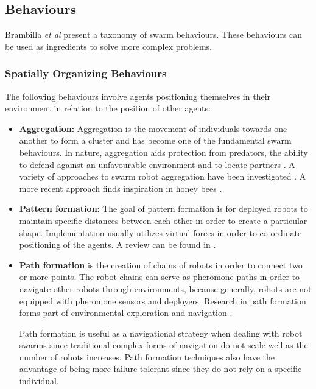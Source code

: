 \subsection{Behaviours}
\label{swarmrobotapplications}

Brambilla \textit{et al} \cite{brambilla2013swarm} present a taxonomy of swarm behaviours. These behaviours can be used as ingredients to solve more complex problems.

\subsubsection{Spatially Organizing Behaviours}
The following behaviours involve agents positioning themselves in their environment in relation to the position of other agents:

\begin{itemize}
	\item \textbf{Aggregation:} Aggregation is the movement of individuals towards one another to form a cluster and has become one of the fundamental swarm behaviours. In nature, aggregation aids protection from predators, the ability to defend against an unfavourable environment and to locate partners \cite{bonabeau2001self}. A variety of approaches to swarm robot aggregation have been investigated \cite{yan2011algorithm, soysal2007aggregation, trianni2003evolving}. A more recent approach finds inspiration in honey bees \cite{schmickl2011beeclust, schmickl2009two}.
	
	\item \textbf{Pattern formation}:
	The goal of pattern formation is for deployed robots to maintain specific distances between each other in order to create a particular shape. Implementation usually utilizes virtual forces in order to co-ordinate positioning of the agents. A review can be found in \cite{bahceci2003review, hettiarachchi2009review}.
	
	\item \textbf{Path formation} is the creation of chains of robots in order to connect two or more points. The robot chains can serve as pheromone paths in order to navigate other robots through environments, because generally, robots are not equipped with pheromone sensors and deployers. Research in path formation forms part of environmental exploration and navigation \cite{nouyan2006chain}. 
	
	Path formation is useful as a navigational strategy when dealing with robot swarms since traditional complex forms of navigation do not scale well as the number of robots increases. Path formation techniques also have the advantage of being more failure tolerant since they do not rely on a specific individual.
	

\end{itemize}
